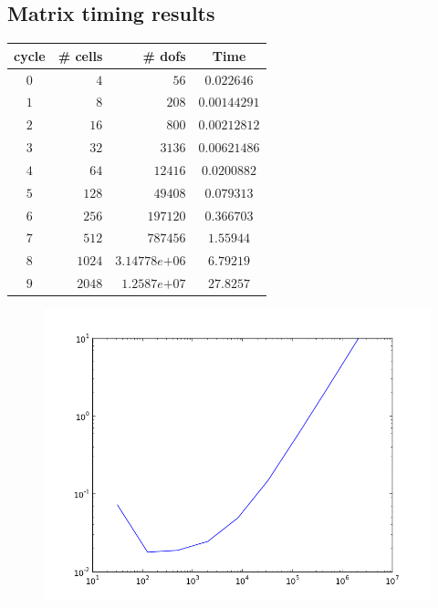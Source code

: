 \documentclass[14pt]{extarticle}
\numberwithin{equation}{section}    %
\begin{document}
\subsection{Matrix timing results}

\begin{table}[H]
\begin{center}
\begin{tabular}{|c|r|r|c|} \hline
cycle & \# cells & \# dofs & Time\\ \hline
$0$ & $4$ & $56$ & $0.022646$\\
            $1$ & $8$ & $208$ & $0.00144291$\\
            $2$ & $16$ & $800$ & $0.00212812$\\
            $3$ & $32$ & $3136$ & $0.00621486$\\
            $4$ & $64$ & $12416$ & $0.0200882$\\
            $5$ & $128$ & $49408$ & $0.079313$\\
            $6$ & $256$ & $197120$ & $0.366703$\\
            $7$ & $512$ & $787456$ & $1.55944$\\
            $8$ & $1024$ & $3.14778e{+06}$ & $6.79219$\\
            $9$ & $2048$ & $1.2587e{+07}$ & $27.8257$\\

\hline
\end{tabular}
\end{center}
\end{table}
\begin{figure}[h!]
\centering
\includegraphics[width=15cm]{FEniCS_timing}
\end{figure}
\end{document}
